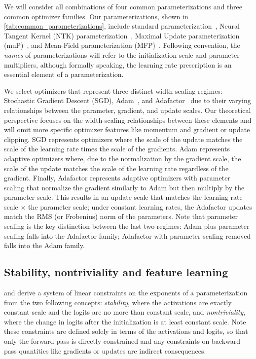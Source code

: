 \documentclass{article}
\theoremstyle{plain}
\theoremstyle{definition}
\theoremstyle{remark}
\begin{document}
We will consider all combinations of four common parameterizations and three common optimizer families. Our parameterizations, shown in \cref{tab:common_parameterizations}, include standard parameterization~\cite{neal1996priors,glorot2010understanding,he2015delving}, Neural Tangent Kernel (NTK) parameterization~\cite{jacot2018neural}, Maximal Update parameterization (muP)~\cite{yang2021tensoriv}, and Mean-Field parameterization (MFP)~\cite{mei2018mean,bordelon2022self}. Following convention, the \emph{names} of parameterizations will refer to the initialization scale and parameter multipliers, although formally speaking, the learning rate prescription is an essential element of a parameterization.

We select optimizers that represent three distinct width-scaling regimes: Stochastic Gradient Descent (SGD), Adam~\cite{kingma2014adam}, and Adafactor~\cite{shazeer2018adafactor} due to their varying relationships between the parameter, gradient, and update scales. Our theoretical perspective focuses on the width-scaling relationships between these elements and will omit more specific optimizer features like momentum and gradient or update clipping. SGD represents optimizers where the scale of the update matches the scale of the learning rate times the scale of the gradients. Adam represents adaptive optimizers where, due to the normalization by the gradient scale, the scale of the update matches the scale of the learning rate regardless of the gradient. Finally, Adafactor represents adaptive optimizers with parameter scaling that normalize the gradient similarly to Adam but then multiply by the parameter scale. This results in an update scale that matches the learning rate scale $\times$ the parameter scale; under constant learning rates, the Adafactor updates match the RMS (or Frobenius) norm of the parameters. Note that parameter scaling is the key distinction between the last two regimes: Adam plus parameter scaling falls into the Adafactor family; Adafactor with parameter scaling removed falls into the Adam family.








\subsection{Stability, nontriviality and feature learning}
\citet{yang2021tensoriv} and \citet{yang2023tensorivb} derive a system of linear constraints on the exponents of a parameterization from the two following concepts: \emph{stability}, where the activations are exactly constant scale and the logits are no more than constant scale, and \emph{nontriviality}, where the change in logits after the initialization is at least constant scale. Note these constraints are defined solely in terms of the activations and logits, so that only the forward pass is directly constrained and any constraints on backward pass quantities like gradients or updates are indirect consequences. 
\end{document}
